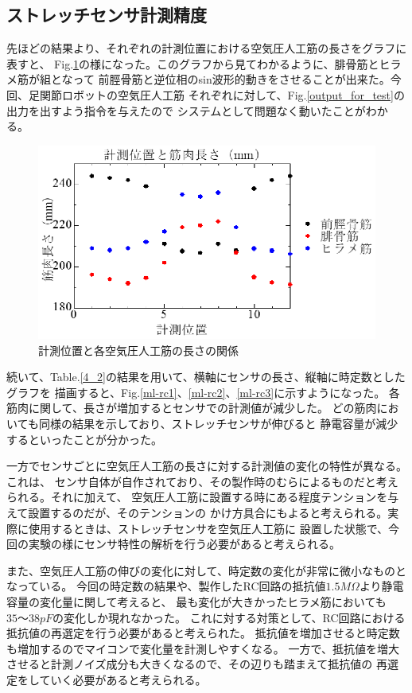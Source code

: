 \subsection{ストレッチセンサ計測精度}
先ほどの結果より、それぞれの計測位置における空気圧人工筋の長さをグラフに表すと、
Fig.\ref{4-ml}の様になった。このグラフから見てわかるように、腓骨筋とヒラメ筋が組となって
前脛骨筋と逆位相のsin波形的動きをさせることが出来た。今回、足関節ロボットの空気圧人工筋
それぞれに対して、Fig.\ref{output_for_test}の出力を出すよう指令を与えたので
システムとして問題なく動いたことがわかる。

\begin{figure}[h]
    \begin{center}
        \includegraphics[width=0.78\columnwidth,clip]{4_consideration/ml.eps}
    \end{center}
    \caption{計測位置と各空気圧人工筋の長さの関係}
    \label{4-ml}
\end{figure}

\newpage

続いて、Table.\ref{4_2}の結果を用いて、横軸にセンサの長さ、縦軸に時定数としたグラフを
描画すると、Fig.\ref{ml-rc1}、\ref{ml-rc2}、\ref{ml-rc3}に示すようになった。
各筋肉に関して、長さが増加するとセンサでの計測値が減少した。
どの筋肉においても同様の結果を示しており、ストレッチセンサが伸びると
静電容量が減少するといったことが分かった。

一方でセンサごとに空気圧人工筋の長さに対する計測値の変化の特性が異なる。これは、
センサ自体が自作されており、その製作時のむらによるものだと考えられる。それに加えて、
空気圧人工筋に設置する時にある程度テンションを与えて設置するのだが、そのテンションの
かけ方具合にもよると考えられる。実際に使用するときは、ストレッチセンサを空気圧人工筋に
設置した状態で、今回の実験の様にセンサ特性の解析を行う必要があると考えられる。

また、空気圧人工筋の伸びの変化に対して、時定数の変化が非常に微小なものとなっている。
今回の時定数の結果や、製作したRC回路の抵抗値$1.5M\Omega$より静電容量の変化量に関して考えると、
最も変化が大きかったヒラメ筋においても$35～38pF$の変化しか現れなかった。
これに対する対策として、RC回路における抵抗値の再選定を行う必要があると考えられた。
抵抗値を増加させると時定数も増加するのでマイコンで変化量を計測しやすくなる。
一方で、抵抗値を増大させると計測ノイズ成分も大きくなるので、その辺りも踏まえて抵抗値の
再選定をしていく必要があると考えられる。

